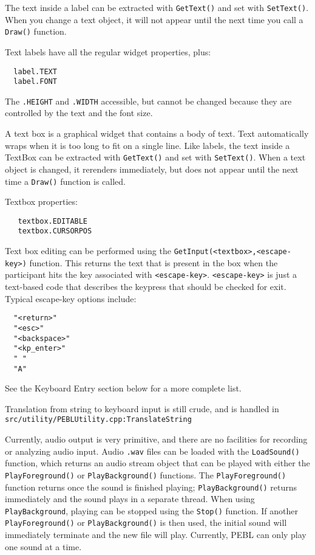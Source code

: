 The text inside a label can be extracted with \texttt{GetText()} 
and set with \texttt{SetText()}. When you change a text object, 
it will not appear until the next time you call a \texttt{Draw()} function.

Text labels have all the regular widget properties, plus:
\begin{verbatim}
  label.TEXT 
  label.FONT
\end{verbatim}
  


The \verb+.HEIGHT+ and \verb+.WIDTH+ accessible, but cannot be changed
because they are controlled by the text and the font size.



A text box is a graphical widget that contains a body of text.  Text
automatically wraps when it is too long to fit on a single line.  Like
labels, the text inside a TextBox can be extracted with
\texttt{GetText()} and set with \texttt{SetText()}. When a text object
is changed, it rerenders immediately, but does not appear until the
next time a \texttt{Draw()} function is called.


Textbox properties:
\begin{verbatim}
   textbox.EDITABLE
   textbox.CURSORPOS 
\end{verbatim}
 



Text box editing can be performed using the \verb+GetInput(<textbox>,<escape-key>)+ function.  This returns the text that is present in the box when the participant hits the key associated with \verb+<escape-key>+.  
\verb+<escape-key>+ is just a text-based code that describes the keypress 
that should be checked for exit. Typical escape-key options include:
\begin{verbatim}
  "<return>"
  "<esc>"
  "<backspace>"
  "<kp_enter>"
  " "
  "A"
\end{verbatim}
 
See the Keyboard Entry section below for a more complete list.

Translation from string to keyboard input is still crude, 
and is handled in \texttt{src/utility/PEBLUtility.cpp:TranslateString} 

\newpage
{}

Currently, audio output is very primitive, and there are no facilities for recording or analyzing audio input. Audio \texttt{.wav} files can be loaded with the \texttt{LoadSound()} function, which returns an audio stream object that can be played  with either the \texttt{PlayForeground()} or \texttt{PlayBackground()} functions.  
The \texttt{PlayForeground()} function returns once the sound is finished playing; \texttt{PlayBackground()} returns immediately and the sound plays in a separate thread.  When using \texttt{PlayBackground}, playing can be stopped using the \texttt{Stop()} function.  If another \texttt{PlayForeground()} or \texttt{PlayBackground()} is then used,
the initial sound will immediately terminate and the new file will play. Currently, PEBL can only play one sound at a time.

